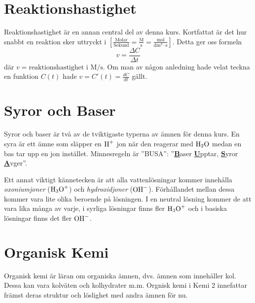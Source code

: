 \documentclass[12pt]{article}
\theoremstyle{definition}
\begin{document}
    
    \setcounter{exm}{0}
    
    
    \setcounter{exm}{0}

    \part{Reaktionshastighet}
    Reaktionshastighet är en annan central del av denna kurs. Kortfattat är det hur snabbt en reaktion sker uttryckt i $\mathrm{\left[\frac{Molar}{Sekund} = \frac{M}{s} = \frac{mol}{dm^3 \cdot s}\right]}$. Detta ger oss formeln 
    \begin{equation*}
        v = \frac{\Delta C}{\Delta t} 
    \end{equation*}
    där $v = \text{reaktionshastighet i } \mathrm{M/s}$. Om man av någon anledning hade velat teckna en funktion $C(t)$ hade $v = C'(t) = \frac{dC}{dt}$ gällt.

    
    \setcounter{exm}{0}

    \part{Syror och Baser}
    Syror och baser är två av de tviktigaste typerna av ämnen för denna kurs. En syra är ett ämne som släpper en $\ce{H+}$ jon när den reagerar med $\ce{H2O}$ medan en bas tar upp en jon instället. Minnesregeln är ''BUSA'': ''\underline{\textbf{B}}aser \underline{\textbf{U}}pptar, \underline{\textbf{S}}yror \underline{\textbf{A}}vger''.

    Ett annat viktigt kännetecken är att alla vattenlösningar kommer innehålla \emph{oxoniumjoner} ($\ce{H3O+}$) och \emph{hydroxidjoner} ($\ce{OH-}$). Förhållandet mellan dessa kommer vara lite olika beroende på lösningen. I en neutral lösning kommer de att vara lika många av varje, i syrliga lösningar finns fler $\ce{H3O+}$ och i basiska lösningar finns det fler $\ce{OH-}$.

    

    \part{Organisk Kemi}
    Organisk kemi är läran om organiska ämnen, dvs. ämnen som innehåller kol. Dessa kan vara kolväten och kolhydrater m.m. Orgnisk kemi i Kemi 2 innefattar främst deras struktur och löslighet med andra ämnen för nu.

    
\end{document}
